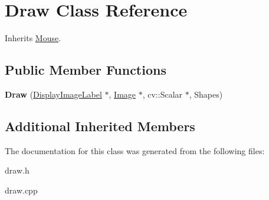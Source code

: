 \hypertarget{class_draw}{}\section{Draw Class Reference}
\label{class_draw}


Inherits \mbox{\hyperlink{class_mouse}{Mouse}}.

\subsection*{Public Member Functions}
\begin{DoxyCompactItemize}
\item 
\mbox{\label{class_draw_af1d06e91639f1209cdef02dfdef16d15}} 
{\bfseries Draw} (\mbox{\hyperlink{class_display_image_label}{Display\+Image\+Label}} $\ast$, \mbox{\hyperlink{class_image}{Image}} $\ast$, cv\+::\+Scalar $\ast$, Shapes)
\end{DoxyCompactItemize}
\subsection*{Additional Inherited Members}


The documentation for this class was generated from the following files\+:\begin{DoxyCompactItemize}
\item 
draw.\+h\item 
draw.\+cpp\end{DoxyCompactItemize}
